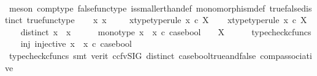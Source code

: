 \begin{isabellebody}
\ \ \ \ \isamarkupfalse%
\ {\isacharparenleft}{\kern0pt}meson\ comp{\isacharunderscore}{\kern0pt}type\ false{\isacharunderscore}{\kern0pt}func{\isacharunderscore}{\kern0pt}type\ is{\isacharunderscore}{\kern0pt}smaller{\isacharunderscore}{\kern0pt}than{\isacharunderscore}{\kern0pt}def\ monomorphism{\isacharunderscore}{\kern0pt}def{}\ true{\isacharunderscore}{\kern0pt}false{\isacharunderscore}{\kern0pt}distinct\ true{\isacharunderscore}{\kern0pt}func{\isacharunderscore}{\kern0pt}type{\isacharparenright}{\kern0pt}\isanewline
{}\isamarkupfalse%
\isanewline
\ \ \isamarkupfalse%
\ x{}\ x{}\ \isanewline
\ \ \isamarkupfalse%
\ x{}{\isacharunderscore}{\kern0pt}type{\isacharbrackleft}{\kern0pt}type{\isacharunderscore}{\kern0pt}rule{\isacharbrackright}{\kern0pt}{\isacharcolon}{\kern0pt}\ {\isachardoublequoteopen}x{}\ {\isasymin}\isactrlsub c\ X{\isachardoublequoteclose}\isanewline
\ \ \isamarkupfalse%
\ x{}{\isacharunderscore}{\kern0pt}type{\isacharbrackleft}{\kern0pt}type{\isacharunderscore}{\kern0pt}rule{\isacharbrackright}{\kern0pt}{\isacharcolon}{\kern0pt}\ {\isachardoublequoteopen}x{}\ {\isasymin}\isactrlsub c\ X{\isachardoublequoteclose}\isanewline
\ \ \isamarkupfalse%
\ distinct{\isacharcolon}{\kern0pt}\ {\isachardoublequoteopen}x{}\ {\isasymnoteq}\ x{}{\isachardoublequoteclose}\ \ \isanewline
\ \ \isamarkupfalse%
\ mono{\isacharunderscore}{\kern0pt}type{\isacharcolon}{\kern0pt}\ {\isachardoublequoteopen}{\isacharparenleft}{\kern0pt}{\isacharparenleft}{\kern0pt}x{}\ {\isasymamalg}\ x{}{\isacharparenright}{\kern0pt}\ {\isasymcirc}\isactrlsub c\ case{\isacharunderscore}{\kern0pt}bool{\isacharparenright}{\kern0pt}\ {\isacharcolon}{\kern0pt}\ {\isasymOmega}\ {\isasymrightarrow}\ X{\isachardoublequoteclose}\isanewline
\ \ \ \ \isamarkupfalse%
\ typecheck{\isacharunderscore}{\kern0pt}cfuncs\isanewline
\ \ \isamarkupfalse%
\ inj{\isacharcolon}{\kern0pt}\ {\isachardoublequoteopen}injective\ {\isacharparenleft}{\kern0pt}{\isacharparenleft}{\kern0pt}x{}\ {\isasymamalg}\ x{}{\isacharparenright}{\kern0pt}\ {\isasymcirc}\isactrlsub c\ case{\isacharunderscore}{\kern0pt}bool{\isacharparenright}{\kern0pt}{\isachardoublequoteclose}\isanewline
\ \ \ \ \isamarkupfalse%
\ {\isacharparenleft}{\kern0pt}typecheck{\isacharunderscore}{\kern0pt}cfuncs{\isacharcomma}{\kern0pt}\ smt\ {\isacharparenleft}{\kern0pt}verit{\isacharcomma}{\kern0pt}\ ccfv{\isacharunderscore}{\kern0pt}SIG{\isacharparenright}{\kern0pt}\ distinct\ case{\isacharunderscore}{\kern0pt}bool{\isacharunderscore}{\kern0pt}true{\isacharunderscore}{\kern0pt}and{\isacharunderscore}{\kern0pt}false\ comp{\isacharunderscore}{\kern0pt}associative{}\ \isanewline

\end{isabellebody}
